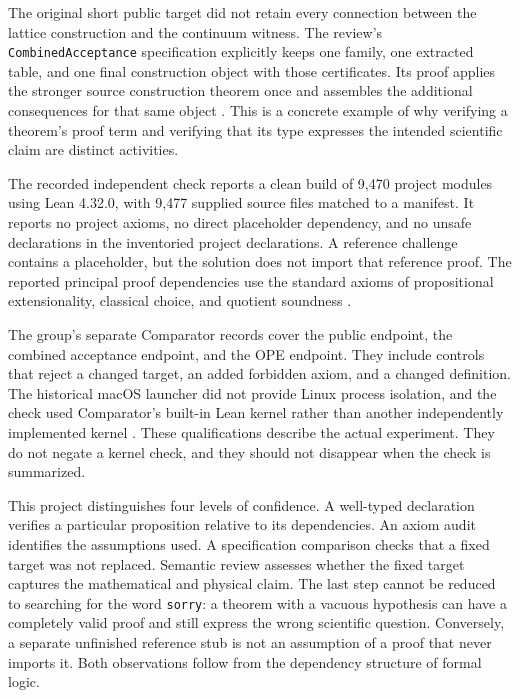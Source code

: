 The original short public target did not retain every connection between
the lattice construction and the continuum witness.  The review's
\texttt{CombinedAcceptance} specification explicitly keeps one family,
one extracted table, and one final construction object with those
certificates.  Its proof applies the stronger source construction theorem
once and assembles the additional consequences for that same object
\cite{YMAcceptance2026,YMCombined2026}.  This is a concrete example of why
verifying a theorem's proof term and verifying that its type expresses the
intended scientific claim are distinct activities.

The recorded independent check reports a clean build of 9,470 project
modules using Lean 4.32.0, with 9,477 supplied source files matched to a
manifest.  It reports no project axioms, no direct placeholder dependency,
and no unsafe declarations in the inventoried project declarations.  A
reference challenge contains a placeholder, but the solution does not
import that reference proof.  The reported principal proof dependencies
use the standard axioms of propositional extensionality, classical choice,
and quotient soundness \cite{YMBuildEvidence2026}.

The group's separate Comparator records cover the public endpoint, the
combined acceptance endpoint, and the OPE endpoint.  They include controls
that reject a changed target, an added forbidden axiom, and a changed
definition.  The historical macOS launcher did not provide Linux process
isolation, and the check used Comparator's built-in Lean kernel rather
than another independently implemented kernel
\cite{YMComparatorEvidence2026}.  These qualifications describe the
actual experiment.  They do not negate a kernel check, and they should
not disappear when the check is summarized.

This project distinguishes four levels of confidence.  A well-typed
declaration verifies a particular proposition relative to its dependencies.
An axiom audit identifies the assumptions used.  A specification comparison
checks that a fixed target was not replaced.  Semantic review assesses
whether the fixed target captures the mathematical and physical claim.
The last step cannot be reduced to searching for the word
\texttt{sorry}: a theorem with a vacuous hypothesis can have a completely
valid proof and still express the wrong scientific question.  Conversely,
a separate unfinished reference stub is not an assumption of a proof that
never imports it.  Both observations follow from the dependency structure
of formal logic.

